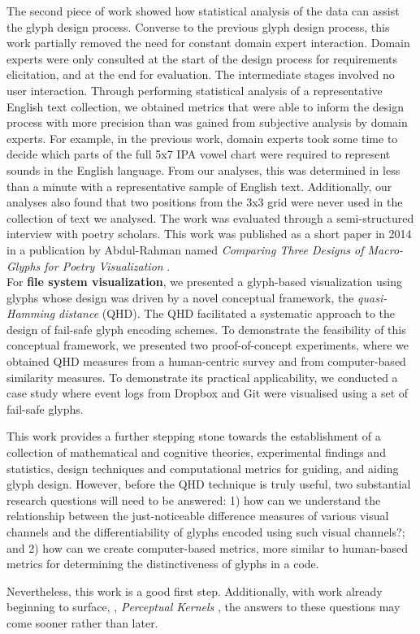 The second piece of work showed how statistical analysis of the data can assist the glyph design process.
Converse to the previous glyph design process, this work partially removed the need for constant domain expert interaction.
Domain experts were only consulted at the start of the design process for requirements elicitation, and at the end for evaluation.
The intermediate stages involved no user interaction.
Through performing statistical analysis of a representative English text collection, we obtained metrics that were able to inform the design process with more precision than was gained from subjective analysis by domain experts.
For example, in the previous work, domain experts took some time to decide which parts of the full 5x7 IPA vowel chart were required to represent sounds in the English language.
From our analyses, this was determined in less than a minute with a representative sample of English text.
Additionally, our analyses also found that two positions from the 3x3 grid were never used in the collection of text we analysed.
The work was evaluated through a semi-structured interview with poetry scholars.
This work was published as a short paper in 2014 in a publication by Abdul-Rahman \etal named \emph{Comparing Three Designs of Macro-Glyphs for Poetry Visualization} \cite{CGF:abdul-rahman14-sp}.\\

For \textbf{file system visualization}, we presented a glyph-based visualization using glyphs whose design was driven by a novel conceptual framework, the \emph{quasi-Hamming distance} (QHD). 
The QHD facilitated a systematic approach to the design of fail-safe glyph encoding schemes.
To demonstrate the feasibility of this conceptual framework, we presented two proof-of-concept experiments, where we obtained QHD measures from a human-centric survey and from computer-based similarity measures.
To demonstrate its practical applicability, we conducted a case study where event logs from Dropbox and Git were visualised using a set of fail-safe glyphs.

This work provides a further stepping stone towards the establishment of a collection of mathematical and cognitive theories, experimental findings and statistics, design techniques and computational metrics for guiding, and aiding glyph design.
However, before the QHD technique is truly useful, two substantial research questions will need to be answered:
1) how can we understand the relationship between the just-noticeable difference measures of various visual channels and the differentiability of glyphs encoded using such visual channels?; and
2) how can we create computer-based metrics, more similar to human-based metrics for determining the distinctiveness of glyphs in a code. 

Nevertheless, this work is a good first step.
Additionally, with work already beginning to surface, \eg, \emph{Perceptual Kernels} \cite{demiralplearning}, the answers to these questions may come sooner rather than later.

